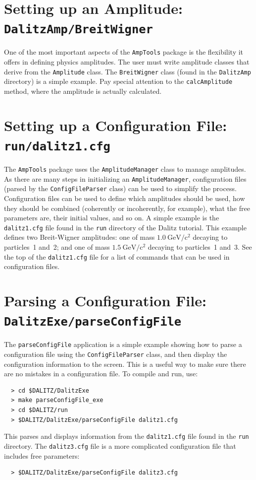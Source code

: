 \documentclass[11pt]{article}
\newcommand{\gevcc}{\mathrm{GeV/c^2}}
\begin{document}
\section{Setting up an Amplitude: \\
{\tt DalitzAmp/BreitWigner}}
\label{sec:bw}

One of the most important aspects of the {\tt AmpTools} package is the flexibility it offers in defining physics amplitudes.  The user must write amplitude classes that derive from the {\tt Amplitude} class.  The {\tt BreitWigner} class (found in the {\tt DalitzAmp} directory) is a simple example.  Pay special attention to the {\tt calcAmplitude} method, where the amplitude is actually calculated.

\section{Setting up a Configuration File: \\
{\tt run/dalitz1.cfg}}
\label{sec:config}



The {\tt AmpTools} package uses the {\tt AmplitudeManager} class to manage amplitudes.  As there are many steps in initializing an {\tt AmplitudeManager}, configuration files (parsed by the {\tt ConfigFileParser} class) can be used to simplify the process.  Configuration files can be used to define which amplitudes should be used, how they should be combined (coherently or incoherently, for example), what the free parameters are, their initial values, and so on.  A simple example is the {\tt dalitz1.cfg} file found in the {\tt run} directory of the Dalitz tutorial.  This example defines two Breit-Wigner amplitudes: one of mass $1.0~\gevcc$ decaying to particles~1 and~2; and one of mass $1.5~\gevcc$ decaying to particles~1 and~3.  See the top of the {\tt dalitz1.cfg} file for a list of commands that can be used in configuration files.

\section{Parsing a Configuration File: \\
{\tt DalitzExe/parseConfigFile}}

The {\tt parseConfigFile} application is a simple example showing how to parse a configuration file using the {\tt ConfigFileParser} class, and then display the configuration information to the screen.  This is a useful way to make sure there are no mistakes in a configuration file.  To compile and run, use:
\begin{verbatim}
  > cd $DALITZ/DalitzExe
  > make parseConfigFile_exe
  > cd $DALITZ/run
  > $DALITZ/DalitzExe/parseConfigFile dalitz1.cfg
\end{verbatim}
This parses and displays information from the {\tt dalitz1.cfg} file found in the {\tt run} directory.  The {\tt dalitz3.cfg} file is a more complicated configuration file that includes free parameters:
\begin{verbatim}
  > $DALITZ/DalitzExe/parseConfigFile dalitz3.cfg
\end{verbatim}
\end{document}
